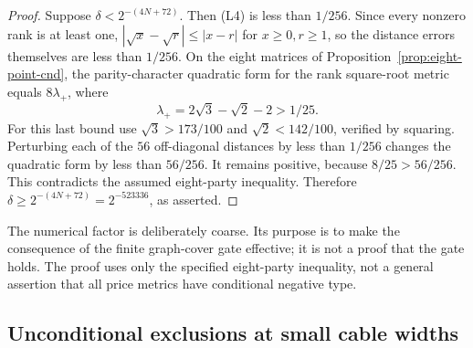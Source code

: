 \begin{proof}
Suppose $\delta<2^{-(4N+72)}$.  Then (L4) is less than
$1/256$.  Since every nonzero rank is at least one,
$|\sqrt x-\sqrt r|\le|x-r|$ for $x\ge0,r\ge1$,
so the distance errors themselves are less than $1/256$.
On the eight matrices of Proposition~\ref{prop:eight-point-cnd},
the parity-character quadratic form for the rank square-root
metric equals $8\lambda_+$, where
\[
 \lambda_+=2\sqrt3-\sqrt2-2>1/25.
\]
For this last bound use $\sqrt3>173/100$ and
$\sqrt2<142/100$, verified by squaring.  Perturbing each of
the $56$ off-diagonal distances by less than $1/256$ changes
the quadratic form by less than $56/256$.  It remains positive,
because $8/25>56/256$.  This contradicts the assumed eight-party
inequality.  Therefore
$\delta\ge2^{-(4N+72)}=2^{-523336}$, as asserted.
\end{proof}

The numerical factor is deliberately coarse.  Its purpose is to
make the consequence of the finite graph-cover gate effective;
it is not a proof that the gate holds.  The proof uses only the
specified eight-party inequality, not a general assertion that
all price metrics have conditional negative type.

\subsection{Unconditional exclusions at small cable widths}

